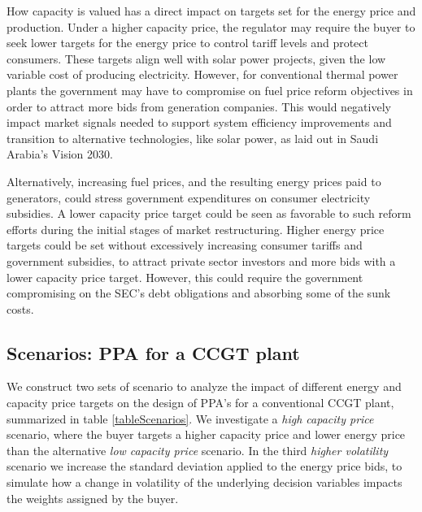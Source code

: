 \documentclass[informs]{informs3}
\begin{document}
How capacity is valued has a direct impact on targets set for the energy price and production. Under a higher capacity price, the regulator may require the buyer to seek lower targets for the energy price to control tariff levels and protect consumers. These targets align well with solar power projects, given the low variable cost of producing electricity. However, for conventional thermal power plants the government may have to compromise on fuel price reform objectives in order to attract more bids from generation companies. This would negatively impact market signals needed to support system efficiency improvements and transition to alternative technologies, like solar power, as laid out in Saudi Arabia’s Vision 2030. 

Alternatively, increasing fuel prices, and the resulting energy prices paid to generators, could stress government expenditures on consumer electricity subsidies. A lower capacity price target could be seen as favorable to such reform efforts during the initial stages of market restructuring. Higher energy price targets could be set without excessively increasing consumer tariffs and government subsidies, to attract private sector investors and more bids with a lower capacity price target. However, this could require the government compromising on the SEC’s debt obligations and absorbing some of the sunk costs.

\subsection{Scenarios: PPA for a CCGT plant }\label{subsection_ScenarioDesign}

We construct two sets of scenario to analyze the impact of different energy and capacity price targets on the design of PPA's for a conventional CCGT plant,  summarized in table \ref{tableScenarios}. We investigate a \textit{high capacity price} scenario, where the buyer targets a higher capacity price and lower energy price than the alternative \textit{low capacity price} scenario. In the third \textit{higher volatility} scenario we increase the standard deviation applied to the energy price bids, to simulate how a change in volatility of the underlying decision variables impacts the weights assigned by the buyer.
\end{document}
